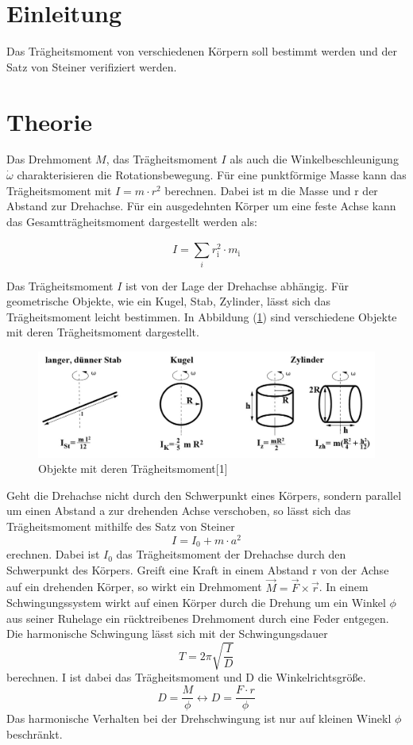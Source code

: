 \section{Einleitung}
Das Trägheitsmoment von verschiedenen Körpern soll bestimmt werden und der Satz von Steiner verifiziert werden.
\section{Theorie}
Das Drehmoment $M$, das Trägheitsmoment $I$ als auch die Winkelbeschleunigung $\dot{\omega}$ charakterisieren die Rotationsbewegung.
Für eine punktförmige Masse kann das Trägheitsmoment mit $I = m\cdot r^2$ berechnen. Dabei ist m die Masse und r der Abstand zur Drehachse.
Für ein ausgedehnten Körper um eine feste Achse kann das Gesamtträgheitsmoment dargestellt werden als:

\begin{equation*}
  I=\sum \limits_{i}^{} r_\text{i}^2 \cdot m_\text{i}
\end{equation*}

Das Trägheitsmoment $I$ ist von der Lage der Drehachse abhängig.
Für geometrische Objekte, wie ein Kugel, Stab, Zylinder, lässt sich das Trägheitsmoment
leicht bestimmen.
In Abbildung (\ref{fig:Abb1}) sind verschiedene Objekte mit deren Trägheitsmoment dargestellt.
\begin{figure}[H]
\centering
\includegraphics[width=\textwidth]{Bild1.jpg}
\caption{Objekte mit deren Trägheitsmoment[1]}
\label{fig:Abb1}
\end{figure}
Geht die Drehachse nicht durch den Schwerpunkt eines Körpers, sondern parallel um einen Abstand a
zur drehenden Achse verschoben, so lässt sich das Trägheitsmoment mithilfe des Satz von Steiner
\begin{equation}
  I = I_\text{0} + m\cdot a^2
  \label{eq:1}
\end{equation}
erechnen. Dabei ist $I_\text{0}$ das Trägheitsmoment der Drehachse durch den Schwerpunkt des Körpers.
Greift eine Kraft in einem Abstand r von der Achse auf ein drehenden Körper, so wirkt ein Drehmoment $\vec{M} = \vec{F} \times \vec{r}$.
In einem Schwingungssystem wirkt auf einen Körper durch die Drehung um ein Winkel $\phi$ aus seiner Ruhelage ein rücktreibenes Drehmoment
durch eine Feder entgegen. Die harmonische Schwingung lässt sich mit der Schwingungsdauer
\begin{equation}
  T = 2\pi \sqrt{\frac{I}{D}}
  \label{eq:2}
\end{equation}
berechnen. I ist dabei das Trägheitsmoment und D die Winkelrichtsgröße.
\begin{equation}
  D = \frac{M}{\phi} \leftrightarrow D = \frac{F \cdot r}{\phi}
  \label{eq:3}
\end{equation}
Das harmonische Verhalten bei der Drehschwingung ist nur auf kleinen Winekl $\phi$
beschränkt.
